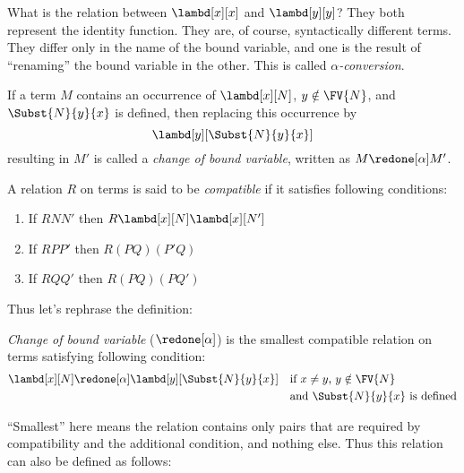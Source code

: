 \documentclass[../../../include/open-logic-section]{subfiles}
\begin{document}

What is the relation between $\lambd[x][x]$ and $\lambd[y][y]$? They
both represent the identity function. They are, of course,
syntactically different terms. They differ only in the name of the
bound variable, and one is the result of ``renaming'' the bound
variable in the other. This is called \emph{$\alpha$-conversion}.

\begin{defn}
  If a term $M$ contains an occurrence of $\lambd[x][N]$, $y \notin
  \FV{N}$, and $\Subst{N}{y}{x}$ is defined, then replacing this occurrence
  by 
  \begin{equation*}
    \lambd[y][\Subst{N}{y}{x}]
  \end{equation*}
  resulting in $M'$ is called a \emph{change of bound variable}, written
  as $M \redone[\alpha] M'$.
\end{defn}

\begin{defn}
  A relation $R$ on terms is said to be \emph{compatible}
  if it satisfies following conditions:
  \begin{enumerate}
  \item If $R N N'$ then $R \lambd[x][N] \lambd[x][N']$
  \item If $R P P'$ then $R (PQ) (P'Q)$
  \item If $R Q Q'$ then $R (PQ) (PQ')$
  \end{enumerate}
\end{defn}

Thus let's rephrase the definition:
\begin{defn}
  \emph{Change of bound variable} ($\redone[\alpha]$) is 
  the smallest compatible relation on terms satisfying following
  condition:
  \begin{align*}
    &\lambd[x][N] \redone[\alpha] \lambd[y][\Subst{N}{y}{x}] && \text{if
      $x \neq y$, $y \notin \FV{N}$} \\
    & &&\text{and $\Subst{N}{y}{x}$ is defined}
  \end{align*}
\end{defn}

``Smallest'' here means the relation contains only pairs that are required by
compatibility and the additional condition, and nothing else. Thus
this relation can also be defined as follows:
\end{document}
